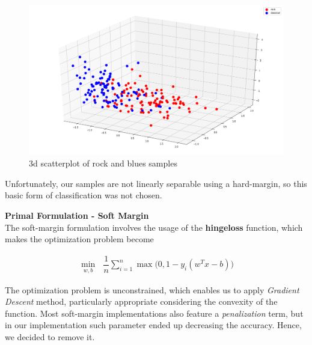 \documentclass[12pt]{article}
\begin{document}
	\begin{figure}[H]
		\hspace{120pt}\includegraphics[scale=0.2]{exp1_legend}
		\caption{3d scatterplot of rock and blues samples}
	\end{figure}
	
	Unfortunately, our samples are not linearly separable using a hard-margin, so this basic form of classification was not chosen.\newline
	
	\textbf{Primal Formulation - Soft Margin}\\
	The soft-margin formulation involves the usage of the \textbf{hingeloss} function, which makes the optimization problem become
	
	\begin{align}
		\min_{w,b}\ \ \ \dfrac {1}{n} \sum_{i=1}^n{\max{\Big(0,1-y_i(w^Tx-b)\Big)}}
	\end{align}

	The optimization problem is unconstrained, which enables us to apply \textit{Gradient Descent} method, particularly appropriate considering the convexity of the function. Most soft-margin implementations also feature a \textit{penalization} term, but in our implementation such parameter ended up decreasing the accuracy. Hence, we decided to remove it.
	
\end{document}
